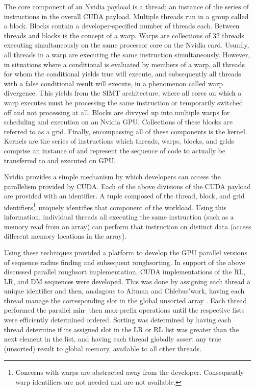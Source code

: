 \documentclass[letterpaper, 12pt]{article}
\begin{document}
The core component of an Nvidia payload is a thread; an instance of the series of instructions in the overall CUDA payload.  Multiple threads run in a group called a block.  Blocks contain a developer-specified number of threads each.  Between threads and blocks is the concept of a warp.  Warps are collections of 32 threads executing simultaneously on the same processor core on the Nvidia card.  Usually, all threads in a warp are executing the same instruction simultaneously. However, in situations where a conditional is evaluated by members of a warp, all threads for whom the conditional yields true will execute, and subsequently all threads with a false conditional result will execute, in a phenomenon called warp divergence.  This yields from the SIMT architecture, where all cores on which a warp executes must be processing the same instruction or temporarily switched off and not processing at all.  Blocks are divvyed up into multiple warps for scheduling and execution on an Nvidia GPU.  Collections of these blocks are referred to as a grid.  Finally, encompassing all of these components is the kernel.  Kernels are the series of instructions which threads, warps, blocks, and grids comprise an instance of and represent the sequence of code to actually be transferred to and executed on GPU.

Nvidia provides a simple mechanism by which developers can access the parallelism provided by CUDA.  Each of the above divisions of the CUDA payload are provided with an identifier.  A tuple composed of the thread, block, and grid identifiers\footnote{Concerns with warps are abstracted away from the developer.  Consequently warp identifiers are not needed and are not available.} uniquely identifies that component of the workload.  Using this information, individual threads all executing the same instruction (such as a memory read from an array) can perform that instruction on distinct data (access different memory locations in the array).\cite{nvidiaguide}

Using these techniques provided a platform to develop the GPU parallel versions of sequence radius finding and subsequent roughsorting.  In support of the above discussed parallel roughsort implementation, CUDA implementations of the RL, LR, and DM sequences were developed.  This was done by assigning each thread a unique identifier and then, analagous to Altman and Chlebus\textquoteright work, having each thread manage the corresponding slot in the global unsorted array \cite{altman89}.  Each thread performed the parallel min- then max-prefix operations until the respective lists were efficiently determined ordered.  Sorting was determined by having each thread determine if its assigned slot in the LR or RL list was greater than the next element in the list, and having each thread globally assert any true (unsorted) result to global memory, available to all other threads.
\end{document}
